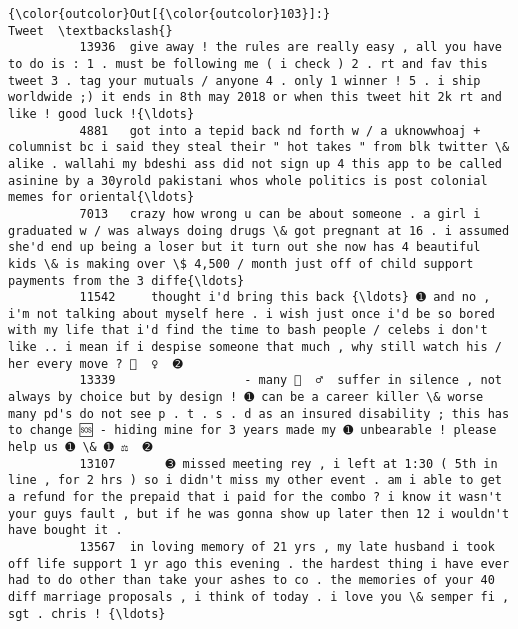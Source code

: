 \documentclass[11pt]{article}
\begin{document}
\begin{Verbatim}[commandchars=\\\{\}]
{\color{outcolor}Out[{\color{outcolor}103}]:}                                                                                                                                                                                                                                                                                          Tweet  \textbackslash{}
          13936  give away ! the rules are really easy , all you have to do is : 1 . must be following me ( i check ) 2 . rt and fav this tweet 3 . tag your mutuals / anyone 4 . only 1 winner ! 5 . i ship worldwide ;) it ends in 8th may 2018 or when this tweet hit 2k rt and like ! good luck !{\ldots}   
          4881   got into a tepid back nd forth w / a uknowwhoaj + columnist bc i said they steal their " hot takes " from blk twitter \& alike . wallahi my bdeshi ass did not sign up 4 this app to be called asinine by a 30yrold pakistani whos whole politics is post colonial memes for oriental{\ldots}   
          7013   crazy how wrong u can be about someone . a girl i graduated w / was always doing drugs \& got pregnant at 16 . i assumed she'd end up being a loser but it turn out she now has 4 beautiful kids \& is making over \$ 4,500 / month just off of child support payments from the 3 diffe{\ldots}   
          11542     thought i'd bring this back {\ldots} ➊ and no , i'm not talking about myself here . i wish just once i'd be so bored with my life that i'd find the time to bash people / celebs i don't like .. i mean if i despise someone that much , why still watch his / her every move ? 🤦 ‍ ♀ ️ ➋   
          13339                  - many 👮 ‍ ♂ ️ suffer in silence , not always by choice but by design ! ➊ can be a career killer \& worse many pd's do not see p . t . s . d as an insured disability ; this has to change 🆘 - hiding mine for 3 years made my ➊ unbearable ! please help us ➊ \& ➊ ⚖ ️ ➋   
          13107       ➌ missed meeting rey , i left at 1:30 ( 5th in line , for 2 hrs ) so i didn't miss my other event . am i able to get a refund for the prepaid that i paid for the combo ? i know it wasn't your guys fault , but if he was gonna show up later then 12 i wouldn't have bought it .   
          13567  in loving memory of 21 yrs , my late husband i took off life support 1 yr ago this evening . the hardest thing i have ever had to do other than take your ashes to co . the memories of your 40 diff marriage proposals , i think of today . i love you \& semper fi , sgt . chris ! {\ldots}   

\end{Verbatim}
\end{document}
